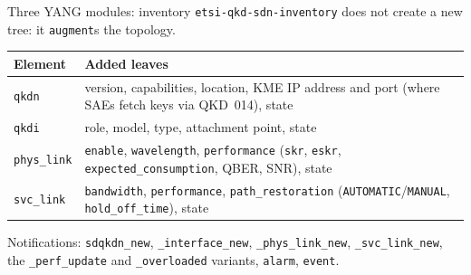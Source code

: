 \documentclass[10pt]{beamer}
\begin{document}
\begin{frame}{Three YANG modules: inventory}
  \small \texttt{etsi-qkd-sdn-inventory} does not create a new tree: it
  \alert{\texttt{augment}}s the topology.
  \vspace{1ex}

  \footnotesize
  \begin{tabularx}{\textwidth}{@{}l L@{}}
    \toprule
    \textbf{Element} & \textbf{Added leaves} \\
    \midrule
    \texttt{qkdn} & version, capabilities, location, KME IP address and
    port (where SAEs fetch keys via QKD~014), state \\
    \texttt{qkdi} & role, model, type, attachment point, state \\
    \texttt{phys\_link} & \texttt{enable}, \texttt{wavelength},
    \texttt{performance} (\texttt{skr}, \texttt{eskr},
    \texttt{expected\_consumption}, QBER, SNR), state \\
    \texttt{svc\_link} & \texttt{bandwidth}, \texttt{performance},
    \texttt{path\_restoration} (\texttt{AUTOMATIC}/\texttt{MANUAL},
    \texttt{hold\_off\_time}), state \\
    \bottomrule
  \end{tabularx}
  \vspace{1.5ex}

  \small Notifications: \texttt{sdqkdn\_new}, \texttt{\_interface\_new},
  \texttt{\_phys\_link\_new}, \texttt{\_svc\_link\_new}, the
  \texttt{\_perf\_update} and \texttt{\_overloaded} variants,
  \texttt{alarm}, \texttt{event}.
\end{frame}
\end{document}
